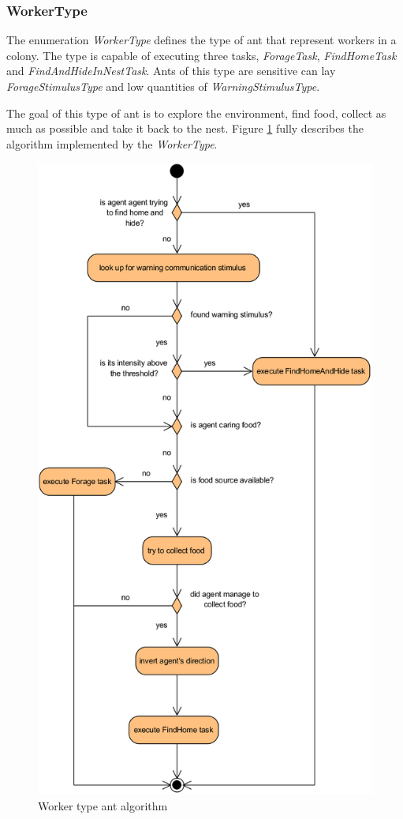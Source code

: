 \subsubsection{WorkerType}

The enumeration \emph{WorkerType} defines the type of ant that represent workers in a colony. The type is capable of executing three tasks, \emph{ForageTask}, \emph{FindHomeTask} and \emph{FindAndHideInNestTask}. Ants of this type are sensitive can lay \emph{ForageStimulusType} and low quantities of \emph{WarningStimulusType}. 

The goal of this type of ant is to explore the environment, find food,  collect as much as possible and take it back to the nest. Figure \ref{fig:worker-type} fully describes the algorithm implemented by the \emph{WorkerType}.

\begin{figure}[H]
  \centering
  \includegraphics[width=0.8\linewidth]{gfx/uml-worker-type.png}
  \caption{Worker type ant algorithm}
  \label{fig:worker-type}
\end{figure}

